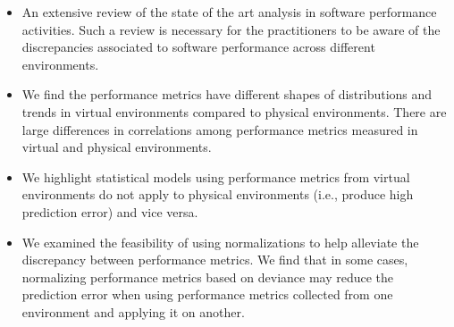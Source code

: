 \begin{itemize}
	\item An extensive review of the state of the art analysis in software performance activities. Such a review is necessary for the practitioners to be aware of the discrepancies associated to software performance across different environments.
	
	\item We find the performance metrics have different shapes of distributions and trends in virtual environments compared to physical environments. There are large differences in correlations among performance metrics measured in virtual and physical environments.
	\item We highlight statistical models using performance metrics from virtual environments do not apply to physical environments (i.e., produce high prediction error) and vice versa.
	\item  We examined the feasibility of using normalizations to help alleviate the discrepancy between performance metrics. We find that in some cases, normalizing performance metrics based on deviance may reduce the prediction error when using performance metrics collected from one environment and applying it on another. 
\end{itemize}